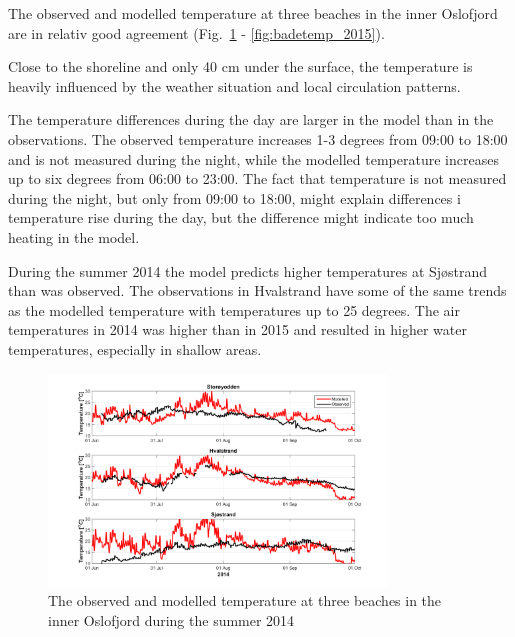 \documentclass[12pt,a4paper,english]{article}
\begin{document}
The observed and modelled temperature at three beaches in the inner Oslofjord are in relativ good agreement (Fig.~\ref{fig:badetemp_2014} - \ref{fig:badetemp_2015}). 

Close to the shoreline and only 40 cm under the surface, the temperature is heavily influenced by the weather situation and local circulation patterns. 

The temperature differences during the day are larger in the model than in the observations. The observed temperature increases 1-3 degrees from 09:00 to 18:00 and is not measured during the night, while the modelled temperature increases up to six degrees from 06:00 to 23:00. The fact that temperature is not measured during the night, but only from 09:00 to 18:00, might explain differences i temperature rise during the day, but the difference might indicate too much heating in the model.


During the summer 2014 the model predicts higher temperatures at Sj\o strand than was observed. The observations in Hvalstrand have some of the same trends as the modelled temperature with temperatures up to 25 degrees. The air temperatures in 2014 was higher than in 2015 and resulted in higher water temperatures, especially in shallow areas. 



\begin{figure}[ht]
\centerline{
\includegraphics*[trim=0 0 0 0,clip=true,width=0.8\textwidth]{Figurer/badetemp_2014}
}
\caption{\small
The observed and modelled temperature at three beaches in the inner Oslofjord during the summer 2014}
\label{fig:badetemp_2014}
\end{figure}
\end{document}
